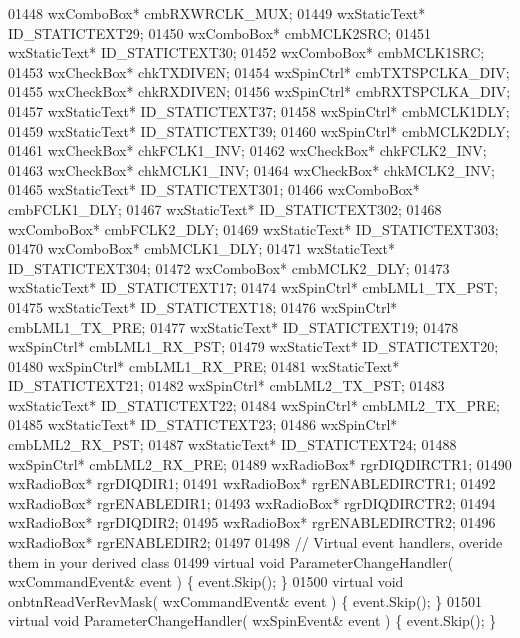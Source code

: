 \begin{DoxyCode}
01448         wxComboBox* cmbRXWRCLK_MUX;
01449         wxStaticText* ID_STATICTEXT29;
01450         wxComboBox* cmbMCLK2SRC;
01451         wxStaticText* ID_STATICTEXT30;
01452         wxComboBox* cmbMCLK1SRC;
01453         wxCheckBox* chkTXDIVEN;
01454         wxSpinCtrl* cmbTXTSPCLKA_DIV;
01455         wxCheckBox* chkRXDIVEN;
01456         wxSpinCtrl* cmbRXTSPCLKA_DIV;
01457         wxStaticText* ID_STATICTEXT37;
01458         wxSpinCtrl* cmbMCLK1DLY;
01459         wxStaticText* ID_STATICTEXT39;
01460         wxSpinCtrl* cmbMCLK2DLY;
01461         wxCheckBox* chkFCLK1_INV;
01462         wxCheckBox* chkFCLK2_INV;
01463         wxCheckBox* chkMCLK1_INV;
01464         wxCheckBox* chkMCLK2_INV;
01465         wxStaticText* ID_STATICTEXT301;
01466         wxComboBox* cmbFCLK1_DLY;
01467         wxStaticText* ID_STATICTEXT302;
01468         wxComboBox* cmbFCLK2_DLY;
01469         wxStaticText* ID_STATICTEXT303;
01470         wxComboBox* cmbMCLK1_DLY;
01471         wxStaticText* ID_STATICTEXT304;
01472         wxComboBox* cmbMCLK2_DLY;
01473         wxStaticText* ID_STATICTEXT17;
01474         wxSpinCtrl* cmbLML1_TX_PST;
01475         wxStaticText* ID_STATICTEXT18;
01476         wxSpinCtrl* cmbLML1_TX_PRE;
01477         wxStaticText* ID_STATICTEXT19;
01478         wxSpinCtrl* cmbLML1_RX_PST;
01479         wxStaticText* ID_STATICTEXT20;
01480         wxSpinCtrl* cmbLML1_RX_PRE;
01481         wxStaticText* ID_STATICTEXT21;
01482         wxSpinCtrl* cmbLML2_TX_PST;
01483         wxStaticText* ID_STATICTEXT22;
01484         wxSpinCtrl* cmbLML2_TX_PRE;
01485         wxStaticText* ID_STATICTEXT23;
01486         wxSpinCtrl* cmbLML2_RX_PST;
01487         wxStaticText* ID_STATICTEXT24;
01488         wxSpinCtrl* cmbLML2_RX_PRE;
01489         wxRadioBox* rgrDIQDIRCTR1;
01490         wxRadioBox* rgrDIQDIR1;
01491         wxRadioBox* rgrENABLEDIRCTR1;
01492         wxRadioBox* rgrENABLEDIR1;
01493         wxRadioBox* rgrDIQDIRCTR2;
01494         wxRadioBox* rgrDIQDIR2;
01495         wxRadioBox* rgrENABLEDIRCTR2;
01496         wxRadioBox* rgrENABLEDIR2;
01497         
01498         \textcolor{comment}{// Virtual event handlers, overide them in your derived class}
01499         \textcolor{keyword}{virtual} \textcolor{keywordtype}{void} ParameterChangeHandler( wxCommandEvent& event ) \{ \textcolor{keyword}{event}.Skip(); \}
01500         \textcolor{keyword}{virtual} \textcolor{keywordtype}{void} onbtnReadVerRevMask( wxCommandEvent& event ) \{ \textcolor{keyword}{event}.Skip(); \}
01501         \textcolor{keyword}{virtual} \textcolor{keywordtype}{void} ParameterChangeHandler( wxSpinEvent& event ) \{ \textcolor{keyword}{event}.Skip(); \}

\end{DoxyCode}
